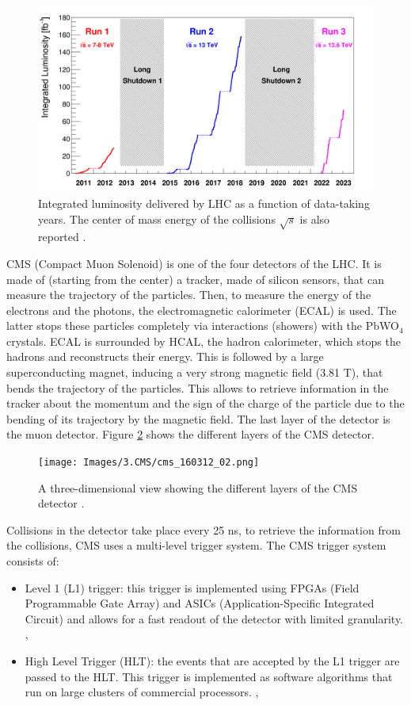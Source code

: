\begin{figure}[hbt]
    \centering
    \includegraphics[width=0.5\linewidth]{Images/3.CMS/Run plots.png}
    \caption{Integrated luminosity delivered by LHC as a function of data-taking years. The center of mass energy of the collisions $\sqrt{s}$ is also reported \cite{Runplot}.}
    \label{fig: Runs}
\end{figure}



CMS (Compact Muon Solenoid) is one of the four detectors of the LHC. It is made of (starting from the center) a tracker, made of silicon sensors, that can measure the trajectory of the particles. Then, to measure the energy of the electrons and the photons, the electromagnetic calorimeter (ECAL) is used. The latter stops these particles completely via interactions (showers) with the PbWO$_4$ crystals. ECAL is surrounded by HCAL, the hadron calorimeter, which stops the hadrons and reconstructs their energy. This is followed by a large superconducting magnet, inducing a very strong magnetic field (3.81 T), that bends the trajectory of the particles. This allows to retrieve information in the tracker about the momentum and the sign of the charge of the particle due to the bending of its trajectory by the magnetic field. The last layer of the detector is the muon detector. Figure \ref{fig: CMS detector} shows the different layers of the CMS detector. 

\begin{figure}[hbt]
    \centering
    \texttt{[image: Images/3.CMS/cms\_160312\_02.png]}
    \caption{A three-dimensional view showing the different layers of the CMS detector \cite{CMS3D}.}
    \label{fig: CMS detector}
\end{figure}

Collisions in the detector take place every 25 ns, to retrieve the information from the collisions, CMS uses a multi-level trigger system. The CMS trigger system consists of:
\begin{itemize}
    \item Level 1 (L1) trigger: this trigger is implemented using FPGAs (Field Programmable Gate Array) and ASICs (Application-Specific Integrated Circuit) and allows for a fast readout of the detector with limited granularity. \cite{L1Trigger}, \cite{Trigger}
    \item High Level Trigger (HLT): the events that are accepted by the L1 trigger are passed to the HLT. This trigger is implemented as software algorithms that run on large clusters of commercial processors. \cite{HLT}, \cite{Trigger}
\end{itemize}

